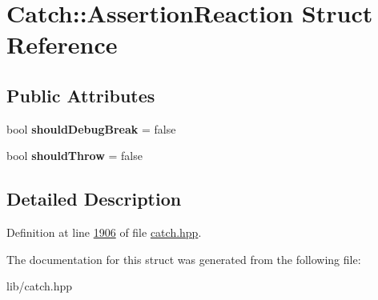 \hypertarget{structCatch_1_1AssertionReaction}{}\section{Catch\+::Assertion\+Reaction Struct Reference}
\label{structCatch_1_1AssertionReaction}
\subsection*{Public Attributes}
\begin{DoxyCompactItemize}
\item 
\mbox{\label{structCatch_1_1AssertionReaction_adcf30fb90ff20d9789df78d424652497}} 
bool {\bfseries should\+Debug\+Break} = false
\item 
\mbox{\label{structCatch_1_1AssertionReaction_a82c8d95a2c1b6a331bde66982a8e090f}} 
bool {\bfseries should\+Throw} = false
\end{DoxyCompactItemize}


\subsection{Detailed Description}


Definition at line \mbox{\hyperlink{catch_8hpp_source_l01906}{1906}} of file \mbox{\hyperlink{catch_8hpp_source}{catch.\+hpp}}.



The documentation for this struct was generated from the following file\+:\begin{DoxyCompactItemize}
\item 
lib/catch.\+hpp\end{DoxyCompactItemize}
